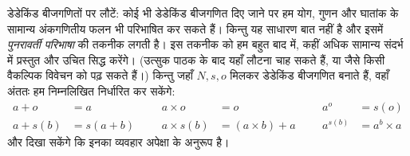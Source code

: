 \documentclass[../../../include/open-logic-section]{subfiles}
\begin{document}
डेडेकिंड बीजगणितों पर लौटें: कोई भी डेडेकिंड बीजगणित दिए जाने पर हम योग, गुणन
और घातांक के सामान्य अंकगणितीय फलन भी परिभाषित कर सकते हैं। किन्तु यह साधारण
बात नहीं है और इसमें \emph{पुनरावर्ती परिभाषा} की तकनीक लगती है। इस तकनीक को
हम बहुत बाद में, कहीं अधिक सामान्य संदर्भ में प्रस्तुत और उचित सिद्ध करेंगे।
(उत्सुक पाठक  के बाद यहाँ लौटना चाह सकते
हैं, या \citealt[pp.~95--8]{Potter2004} जैसे किसी वैकल्पिक विवेचन को पढ़ सकते
हैं।) किन्तु जहाँ $N, s, o$ मिलकर डेडेकिंड बीजगणित बनाते हैं, वहाँ अंततः हम
निम्नलिखित निर्धारित कर सकेंगे:
\begin{align*}
	{a} + {o} &= {a} & & & {a} \times {o} &= {o} & & & {a}^{o} &= s(o)\\
{a} + {s}({b}) &= {s}({a}+{b}) &&& {a} \times {s}({b}) &= ({a}\times {b}) + {a}  & & & {a}^{{s}({b})} &= {a}^{b} \times {a}
\end{align*}
और दिखा सकेंगे कि इनका व्यवहार अपेक्षा के अनुरूप है।
\end{document}
